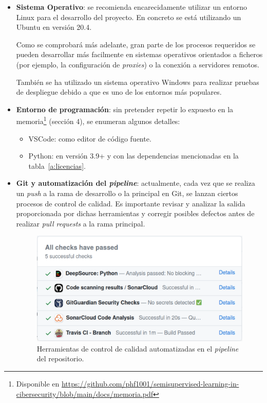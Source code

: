 \begin{itemize}

\item \textbf{Sistema Operativo}: se recomienda encarecidamente utilizar un entorno Linux para el desarrollo del proyecto. En concreto se está utilizando un Ubuntu en versión 20.4.

Como se comprobará más adelante, gran parte de los procesos requeridos se pueden desarrollar más facilmente en sistemas operativos orientados a ficheros (por ejemplo, la configuración de \textit{proxies}) o la conexión a servidores remotos.

También se ha utilizado un sistema operativo Windows para realizar pruebas de despliegue debido a que es uno de los entornos más populares.


\item \textbf{Entorno de programación}: sin pretender repetir lo expuesto en la memoria\footnote{Disponible en \url{https://github.com/phf1001/semisupervised-learning-in-cibersecurity/blob/main/docs/memoria.pdf}} (sección 4), se enumeran algunos detalles:

\begin{itemize}
	\item VSCode: como editor de código fuente.
	\item Python: en versión 3.9+ y con las dependencias mencionadas en la tabla~\ref{a:licencias}.
\end{itemize}

\item \textbf{Git y automatización del \textit{pipeline}}: actualmente, cada vez que se realiza un \textit{push} a la rama de desarrollo o la principal en Git, se lanzan ciertos procesos de control de calidad. Es importante revisar y analizar la salida proporcionada por dichas herramientas y corregir posibles defectos antes de realizar \textit{pull requests} a la rama principal.

\begin{figure}[h]
	\caption[Herramientas: control de calidad automatizado en el \textit{pipeline}]{Herramientas de control de calidad automatizadas en el \textit{pipeline} del repositorio.}
	\centering
	\includegraphics[scale=0.2]{../img/anexos/manual/gitpipeline}
\end{figure}


\end{itemize}
